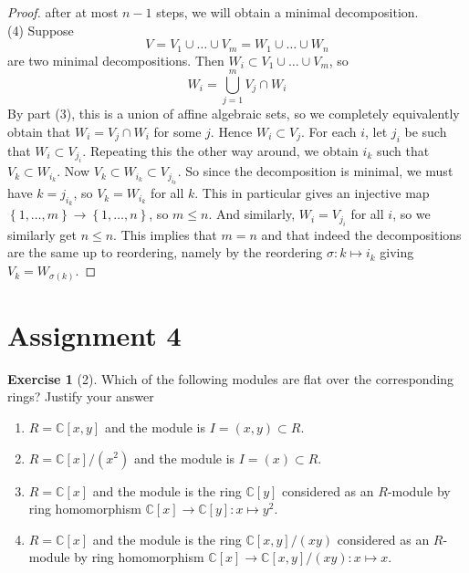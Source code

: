 \documentclass[reqno]{amsart}
\theoremstyle{definition}
\newtheorem{exercise}[theorem]{Exercise}
\theoremstyle{remark}
\begin{document}
\begin{proof}
       after at most $n-1$ steps, we will obtain a minimal
       decomposition.\\
       \linebreak
       (4) Suppose
       \[
       V = V_1 \cup \ldots \cup  V_m =
       W_1 \cup  \ldots \cup W_n
       \]
       are two minimal decompositions.
       Then
       $W_i \subset
       V_1 \cup  \ldots \cup V_m$, so
       \[
       W_i = \bigcup_{j=1}^{m} V_j \cap W_i
       \]
       By part (3), this is a union of affine algebraic sets,
       so we completely equivalently obtain that
       $W_i = V_j \cap W_i$ for some $j$.
       Hence $W_i \subset V_j$.
       For each  $i$, let
       $j_i$ be such that
       $W_i \subset V_{j_i}$.
       Repeating this the other way around, we obtain
       $i_k$ such that
       $V_k \subset W_{i_k}$.
       Now
       $V_k \subset W_{i_k} \subset
       V_{j_{i_k}}$. So since the decomposition is minimal,
       we must have
       $k = j_{i_{k}}$, so
       $V_k = W_{i_k}$ for all $k$.
       This in particular gives an injective map
       $\left\{ 1, \ldots,m \right\} \to
       \left\{ 1, \ldots, n \right\} $, so
       $m\le n$.
       And similarly, $W_i = V_{j_i}$ for all
       $i$, so we similarly get $n\le n$.
       This implies that
       $m = n$ and that indeed the decompositions
       are the same up to reordering, namely by the reordering
       $\sigma \colon k \mapsto i_k$ giving
       $V_{k} =
       W_{\sigma (k)}$.
    \end{proof}


    \section{Assignment 4}
       \begin{exercise}[2]
        Which of the following modules are flat over the
        corresponding rings?
        Justify your answer
        \begin{enumerate}
            \item $R = \mathbb{C}\left[ x,y \right] $ and
                the module is
                $I = \left( x,y \right) \subset R$.
            \item $R = \mathbb{C}\left[ x \right] /
                (x^2)$ and the module is
                $I = (x) \subset R$.
            \item $R = \mathbb{C}\left[ x \right] $ and
                the module is the ring
                $\mathbb{C} \left[ y \right] $ considered
                as an $R$-module by ring
                homomorphism $\mathbb{C} \left[ x \right]
                \to \mathbb{C} \left[ y \right] \colon
                x \mapsto y^2$.
            \item $R = \mathbb{C}\left[ x \right] $ and the
                module is the ring
                $\mathbb{C} \left[ x,y \right]
                /(xy)$ considered as an
                $R$-module by ring
                homomorphism
                $\mathbb{C} \left[ x \right] \to
                \mathbb{C} \left[ x,y \right] / (xy) \colon
                x \mapsto x$.
        \end{enumerate}
    \end{exercise}
\end{document}

